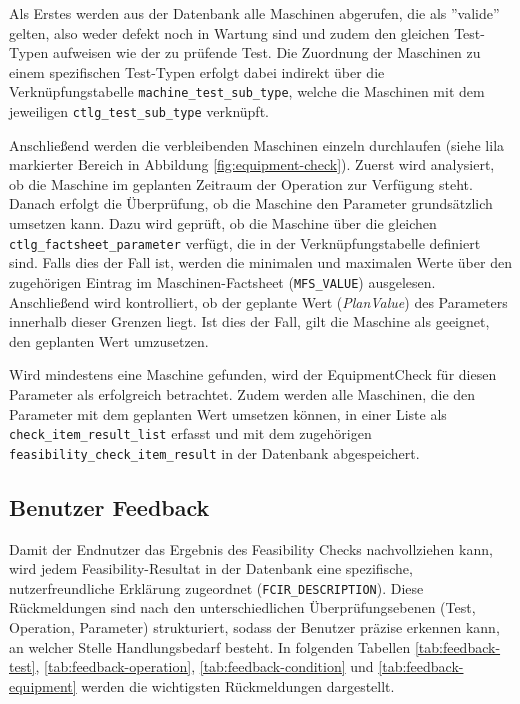 Als Erstes werden aus der Datenbank alle Maschinen abgerufen, die als ''valide'' gelten, also weder defekt noch in Wartung sind und zudem den gleichen Test-Typen aufweisen wie der zu prüfende Test. Die Zuordnung der Maschinen zu einem spezifischen Test-Typen erfolgt dabei indirekt über die Verknüpfungstabelle \texttt{machine\_\-test\_\-sub\_type}, welche die Maschinen mit dem jeweiligen \texttt{ctlg\_test\_sub\_type} verknüpft.

Anschließend werden die verbleibenden Maschinen einzeln durchlaufen (siehe lila markierter Bereich in Abbildung \ref{fig:equipment-check}). Zuerst wird analysiert, ob die Maschine im geplanten Zeitraum der Operation zur Verfügung steht. Danach erfolgt die Überprüfung, ob die Maschine den Parameter grundsätzlich umsetzen kann. Dazu wird geprüft, ob die Maschine über die gleichen \texttt{ctlg\_factsheet\_parameter} verfügt, die in der Verknüpfungstabelle definiert sind. Falls dies der Fall ist, werden die minimalen und maximalen Werte über den zugehörigen Eintrag im Maschinen-Factsheet (\texttt{MFS\_VALUE}) ausgelesen. Anschließend wird kontrolliert, ob der geplante Wert (\textit{PlanValue}) des Parameters innerhalb dieser Grenzen liegt. Ist dies der Fall, gilt die Maschine als geeignet, den geplanten Wert umzusetzen. 

Wird mindestens eine Maschine gefunden, wird der \gls{EquipmentCheck} für diesen Parameter als erfolgreich betrachtet. Zudem werden alle Maschinen, die den Parameter mit dem geplanten Wert umsetzen können, in einer Liste als \texttt{check\_item\_result\_\-list} erfasst und mit dem zugehörigen \texttt{feasibility\_check\_item\_result} in der Datenbank abgespeichert.


\subsection{Benutzer Feedback}\label{Subsec:user-feedback}

Damit der Endnutzer das Ergebnis des Feasibility Checks nachvollziehen kann, wird jedem Feasibility-Resultat in der Datenbank eine spezifische, nutzerfreundliche Erklärung zugeordnet (\texttt{FCIR\_DESCRIPTION}). Diese Rückmeldungen sind nach den unterschiedlichen Überprüfungsebenen (Test, Operation, Parameter) strukturiert, sodass der Benutzer präzise erkennen kann, an welcher Stelle Handlungsbedarf besteht. In folgenden Tabellen \ref{tab:feedback-test}, \ref{tab:feedback-operation}, \ref{tab:feedback-condition} und \ref{tab:feedback-equipment} werden die wichtigsten Rückmeldungen dargestellt.


